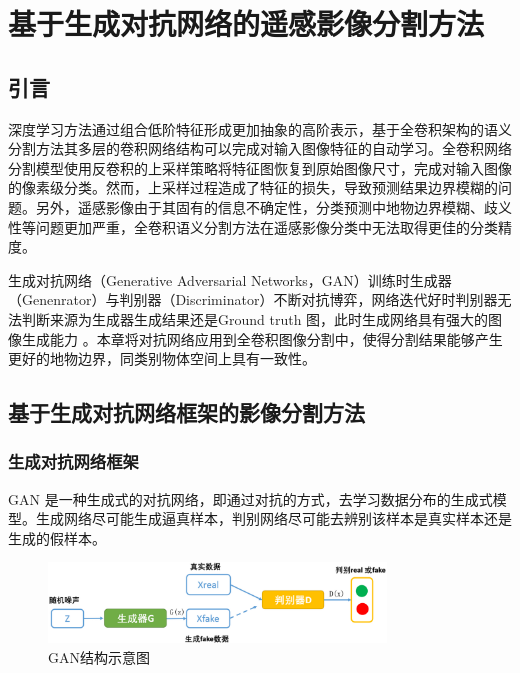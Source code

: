 
\chapter{基于生成对抗网络的遥感影像分割方法}
\label{cha:chap04}

\section{引言}
深度学习方法通过组合低阶特征形成更加抽象的高阶表示，基于全卷积架构的语义分割方法其多层的卷积网络结构可以完成对输入图像特征的自动学习。全卷积网络分割模型使用反卷积的上采样策略将特征图恢复到原始图像尺寸，完成对输入图像的像素级分类。然而，上采样过程造成了特征的损失，导致预测结果边界模糊的问题。另外，遥感影像由于其固有的信息不确定性，分类预测中地物边界模糊、歧义性等问题更加严重，全卷积语义分割方法在遥感影像分类中无法取得更佳的分类精度。

生成对抗网络（Generative Adversarial Networks，GAN）训练时生成器（Genenrator）与判别器（Discriminator）不断对抗博弈，网络迭代好时判别器无法判断来源为生成器生成结果还是Ground truth 图，此时生成网络具有强大的图像生成能力\cite{luc2016semantic} 。本章将对抗网络应用到全卷积图像分割中，使得分割结果能够产生更好的地物边界，同类别物体空间上具有一致性。


\section{基于生成对抗网络框架的影像分割方法}
\label{sec:firtst}

\subsection{生成对抗网络框架}
\label{sec:first-1}
GAN 是一种生成式的对抗网络，即通过对抗的方式，去学习数据分布的生成式模型。生成网络尽可能生成逼真样本，判别网络尽可能去辨别该样本是真实样本还是生成的假样本。

\begin{figure}[htb]
  \centering
  \includegraphics[width=0.8\textwidth]{figures/gan}
  \caption{GAN结构示意图}\label{fig:gan}
\end{figure}

